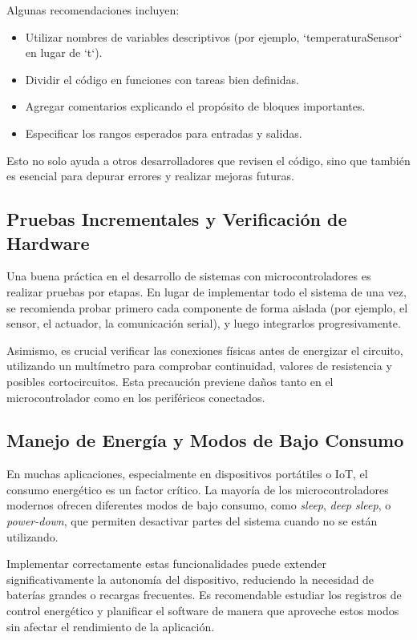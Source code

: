 \documentclass[a4paper,11pt]{article}
\begin{document}
Algunas recomendaciones incluyen:
\begin{itemize}
  \item Utilizar nombres de variables descriptivos (por ejemplo, `temperaturaSensor` en lugar de `t`).
  \item Dividir el c\'odigo en funciones con tareas bien definidas.
  \item Agregar comentarios explicando el prop\'osito de bloques importantes.
  \item Especificar los rangos esperados para entradas y salidas.
\end{itemize}

Esto no solo ayuda a otros desarrolladores que revisen el c\'odigo, sino que tambi\'en es esencial para depurar errores y realizar mejoras futuras.

\subsection{Pruebas Incrementales y Verificaci\'on de Hardware}
Una buena pr\'actica en el desarrollo de sistemas con microcontroladores es realizar pruebas por etapas. En lugar de implementar todo el sistema de una vez, se recomienda probar primero cada componente de forma aislada (por ejemplo, el sensor, el actuador, la comunicaci\'on serial), y luego integrarlos progresivamente.

Asimismo, es crucial verificar las conexiones f\'isicas antes de energizar el circuito, utilizando un mult\'imetro para comprobar continuidad, valores de resistencia y posibles cortocircuitos. Esta precauci\'on previene da\~nos tanto en el microcontrolador como en los perif\'ericos conectados.

\subsection{Manejo de Energ\'ia y Modos de Bajo Consumo}
En muchas aplicaciones, especialmente en dispositivos port\'atiles o IoT, el consumo energ\'etico es un factor cr\'itico. La mayor\'ia de los microcontroladores modernos ofrecen diferentes modos de bajo consumo, como \textit{sleep}, \textit{deep sleep}, o \textit{power-down}, que permiten desactivar partes del sistema cuando no se est\'an utilizando.

Implementar correctamente estas funcionalidades puede extender significativamente la autonom\'ia del dispositivo, reduciendo la necesidad de bater\'ias grandes o recargas frecuentes. Es recomendable estudiar los registros de control energ\'etico y planificar el software de manera que aproveche estos modos sin afectar el rendimiento de la aplicaci\'on.
\end{document}
